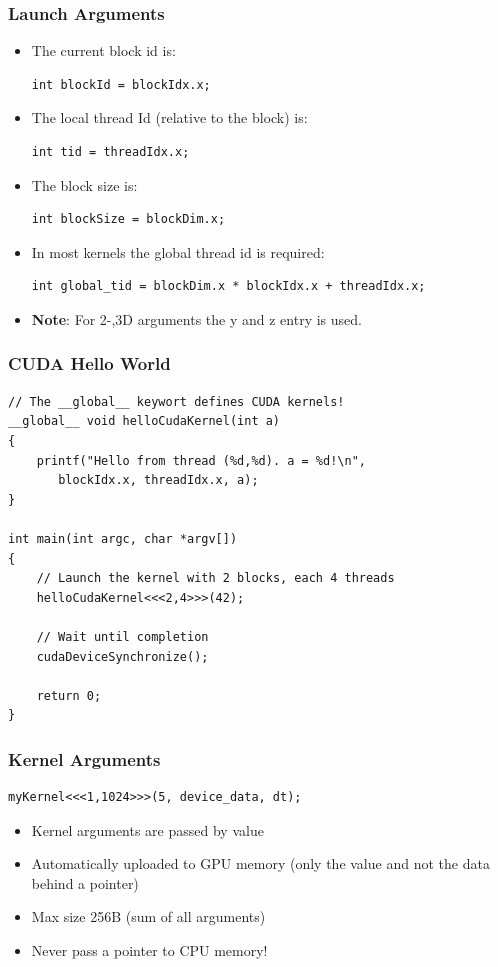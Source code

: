 \documentclass[aspectratio=169]{beamer}
\begin{document}
\begin{frame}[fragile]
\frametitle{Launch Arguments}

\begin{itemize}
	\item The current block id is:
\begin{lstlisting}
int blockId = blockIdx.x;
\end{lstlisting}
	\item The local thread Id (relative to the block) is:
\begin{lstlisting}
int tid = threadIdx.x;
\end{lstlisting}
	\item The block size is:
\begin{lstlisting}
int blockSize = blockDim.x;
\end{lstlisting}	
	\item In most kernels the global thread id is required:
\begin{lstlisting}
int global_tid = blockDim.x * blockIdx.x + threadIdx.x;
\end{lstlisting}
	\item \textbf{Note}: For 2-,3D arguments the y and z entry is used.
\end{itemize}
\end{frame}


\begin{frame}[fragile]
\frametitle{CUDA Hello World}
\begin{lstlisting}
// The __global__ keywort defines CUDA kernels!
__global__ void helloCudaKernel(int a)
{
	printf("Hello from thread (%d,%d). a = %d!\n", 
	   blockIdx.x, threadIdx.x, a);
}

int main(int argc, char *argv[])
{
	// Launch the kernel with 2 blocks, each 4 threads
	helloCudaKernel<<<2,4>>>(42);
	
	// Wait until completion
	cudaDeviceSynchronize();
	
	return 0;
}
\end{lstlisting}
\end{frame}


\begin{frame}[fragile]
\frametitle{Kernel Arguments}

\begin{lstlisting} 
myKernel<<<1,1024>>>(5, device_data, dt);
\end{lstlisting}

\begin{itemize}
	\item Kernel arguments are passed by value
	\item Automatically uploaded to GPU memory (only the value and not the data behind a pointer)
	\item Max size 256B (sum of all arguments)
	\item Never pass a pointer to CPU  memory!
\end{itemize}
\end{frame}
\end{document}
